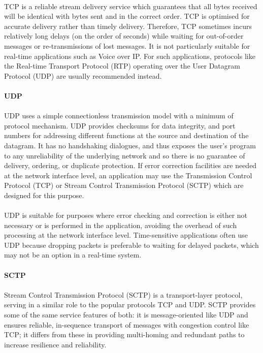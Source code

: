 \paragraph{}
TCP is a reliable stream delivery service which guarantees that all bytes received will be identical with bytes sent and in the correct order. TCP is optimised for accurate delivery rather than timely delivery. Therefore, TCP sometimes incurs relatively long delays (on the order of seconds) while waiting for out-of-order messages or re-transmissions of lost messages. It is not particularly suitable for real-time applications such as Voice over IP. For such applications, protocols like the Real-time Transport Protocol (RTP) operating over the User Datagram Protocol (UDP) are usually recommended instead.

\paragraph{} \textbf{UDP}
\paragraph{}
UDP uses a simple connectionless transmission model with a minimum of protocol mechanism. UDP provides checksums for data integrity, and port numbers for addressing different functions at the source and destination of the datagram. It has no handshaking dialogues, and thus exposes the user's program to any unreliability of the underlying network and so there is no guarantee of delivery, ordering, or duplicate protection. If error correction facilities are needed at the network interface level, an application may use the Transmission Control Protocol (TCP) or Stream Control Transmission Protocol (SCTP) which are designed for this purpose.
\paragraph{}
UDP is suitable for purposes where error checking and correction is either not necessary or is performed in the application, avoiding the overhead of such processing at the network interface level. Time-sensitive applications often use UDP because dropping packets is preferable to waiting for delayed packets, which may not be an option in a real-time system.

\paragraph{} \textbf{SCTP}
\paragraph{}
Stream Control Transmission Protocol (SCTP) is a transport-layer protocol, serving in a similar role to the popular protocols TCP and UDP. SCTP provides some of the same service features of both: it is message-oriented like UDP and ensures reliable, in-sequence transport of messages with congestion control like TCP; it differs from these in providing multi-homing and redundant paths to increase resilience and reliability.

